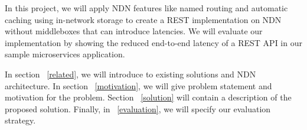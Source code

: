 In this project, we will apply NDN features like named routing and automatic caching using in-network storage to create a REST implementation on NDN without middleboxes that can introduce latencies. We will evaluate our implementation by showing the reduced end-to-end latency of a REST API in our sample microservices application.

In section ~\ref{related}, we will introduce to existing solutions and NDN architecture. In section ~\ref{motivation}, we will give problem statement and motivation for the problem. Section ~\ref{solution} will contain a description of the proposed solution. Finally, in ~\ref{evaluation}, we will specify our evaluation strategy. 



